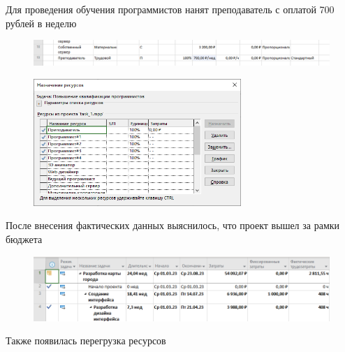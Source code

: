 Для проведения обучения программистов нанят преподаватель с оплатой 700 рублей в неделю

\begin{figure}[H]
	\begin{center}
		\includegraphics[width=\textwidth]{imgs/task_1_14.png}
	\end{center}
\end{figure}

\begin{figure}[H]
	\begin{center}
		\includegraphics[width=0.7\textwidth]{imgs/task_1_15.png}
	\end{center}
\end{figure}

После внесения фактических данных выяснилось, что проект вышел за рамки бюджета

\begin{figure}[H]
	\begin{center}
		\includegraphics[width=\textwidth]{imgs/task_1_16.png}
	\end{center}
\end{figure}

Также появилась перегрузка ресурсов

